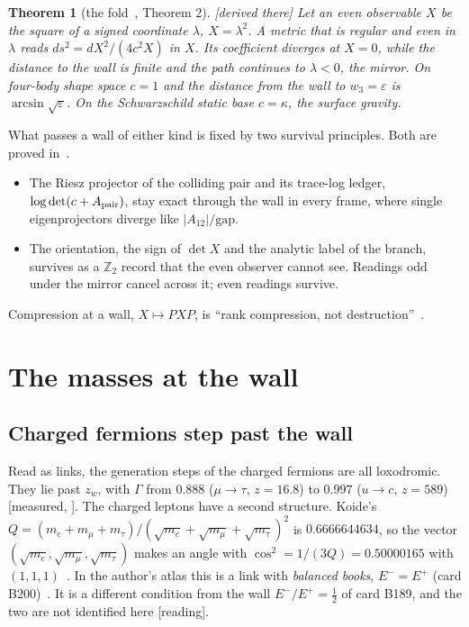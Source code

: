 \documentclass[11pt]{article}
\newtheorem{theorem}{Theorem}\newtheorem{proposition}[theorem]{Proposition}\newtheorem{lemma}[theorem]{Lemma}
\theoremstyle{definition}\newtheorem{hypothesis}{Hypothesis}\newtheorem{prediction}{Prediction}
\theoremstyle{remark}\newtheorem{remark}[theorem]{Remark}
\newcommand{\grade}[1]{\textsf{\small[#1]}}
\begin{document}
\begin{theorem}[the fold~\cite{BH}, Theorem 2]\label{thm:fold}\grade{derived there}
Let an even observable $X$ be the square of a signed coordinate $\lambda$, $X=\lambda^2$. A metric that is regular and even in $\lambda$ reads $ds^2=dX^2/(4c^2X)$ in $X$. Its coefficient diverges at $X=0$, while the distance to the wall is finite and the path continues to $\lambda<0$, the mirror. On four-body shape space $c=1$ and the distance from the wall to $w_3=\varepsilon$ is $\arcsin\sqrt\varepsilon$. On the Schwarzschild static base $c=\kappa$, the surface gravity.
\end{theorem}

What passes a wall of either kind is fixed by two survival principles. Both are proved in~\cite{BH}.
\begin{itemize}[nosep]
\item The Riesz projector of the colliding pair and its trace-log ledger, $\log\det(c+A_{\rm pair})$, stay exact through the wall in every frame, where single eigenprojectors diverge like $|A_{12}|/\mathrm{gap}$.
\item The orientation, the sign of $\det X$ and the analytic label of the branch, survives as a $\mathbb Z_2$ record that the even observer cannot see. Readings odd under the mirror cancel across it; even readings survive.
\end{itemize}
Compression at a wall, $X\mapsto PXP$, is ``rank compression, not destruction''~\cite{BH}.

\section{The masses at the wall}\label{sec:masses}

\subsection{Charged fermions step past the wall}
Read as links, the generation steps of the charged fermions are all loxodromic. They lie past $z_w$, with $\Gamma$ from $0.888$ ($\mu\to\tau$, $z=16.8$) to $0.997$ ($u\to c$, $z=589$) \grade{measured, \cite{SMball}}. The charged leptons have a second structure. Koide's $Q=(m_e+m_\mu+m_\tau)/(\sqrt{m_e}+\sqrt{m_\mu}+\sqrt{m_\tau})^2$ is $0.6666644634$, so the vector $(\sqrt{m_e},\sqrt{m_\mu},\sqrt{m_\tau})$ makes an angle with $\cos^2=1/(3Q)=0.50000165$ with $(1,1,1)$~\cite{Koide}. In the author's atlas this is a link with \emph{balanced books}, $E^-=E^+$ (card B200)~\cite{Atlas}. It is a different condition from the wall $E^-/E^+=\tfrac12$ of card B189, and the two are not identified here \grade{reading}.
\end{document}
